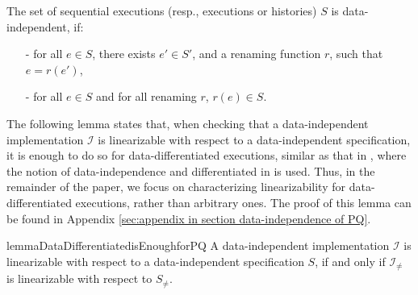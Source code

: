 \begin{definition}\label{def:priority-value data-independence}
The set of sequential executions (resp., executions or histories) $S$ is data-independent, if:
\begin{itemize}
\setlength{\itemsep}{0.5pt}
\item[-] for all $e \in S$, there exists $e' \in S'$, and a renaming function $r$, such that $e=r(e')$,

\item[-] for all $e \in S$ and for all renaming $r$, $r(e) \in S$.
\end{itemize}
\end{definition}

The following lemma states that, when checking that a data-independent implementation $\mathcal{I}$ is linearizable with respect to a data-independent specification, it is enough to do so for data-differentiated executions, similar as that in \cite{Abdulla:2013}, where the notion of data-independence and differentiated in \cite{Wolper:1986} is used. Thus, in the remainder of the paper, we focus on characterizing linearizability for data-differentiated executions, rather than arbitrary ones. The proof of this lemma can be found in Appendix \ref{sec:appendix in section data-independence of PQ}.

\begin{restatable}{lemma}{DataDifferentiatedisEnoughforPQ}
\label{lemma:data differentiated is enough for PQ}
A data-independent implementation $\mathcal{I}$ is linearizable with respect to a data-independent specification $S$, if and only if $\mathcal{I}_{\neq}$ is linearizable with respect to $S_{\neq}$.
\end{restatable}